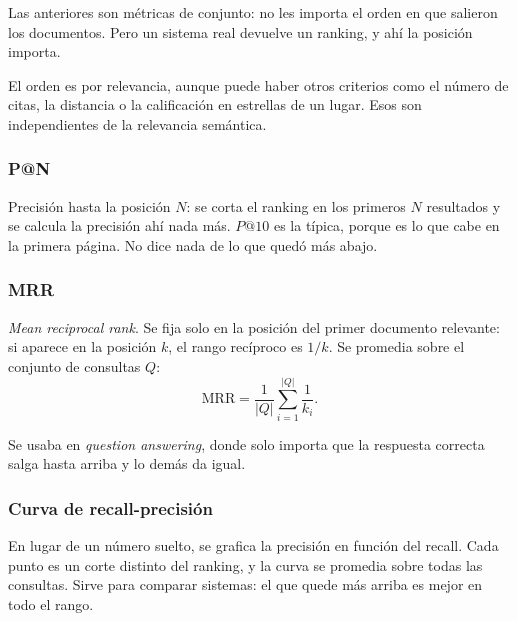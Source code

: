 \documentclass[11pt,letterpaper]{article}
\begin{document}
Las anteriores son métricas de conjunto: no les importa el orden en
que salieron los documentos. Pero un sistema real devuelve un ranking,
y ahí la posición importa.

El orden es por relevancia, aunque puede haber otros criterios como el
número de citas, la distancia o la calificación en estrellas de un
lugar. Esos son independientes de la relevancia semántica.

\subsubsection*{P@N}

Precisión hasta la posición $N$: se corta el ranking en los primeros
$N$ resultados y se calcula la precisión ahí nada más. $P@10$ es la
típica, porque es lo que cabe en la primera página. No dice nada de lo
que quedó más abajo.

\subsubsection*{MRR}

\emph{Mean reciprocal rank}. Se fija solo en la posición del primer
documento relevante: si aparece en la posición $k$, el rango
recíproco es $1/k$. Se promedia sobre el conjunto de consultas $Q$:
\[
    \mathrm{MRR} = \frac{1}{|Q|} \sum_{i=1}^{|Q|} \frac{1}{k_i} .
\]

Se usaba en \emph{question answering}, donde solo importa que la
respuesta correcta salga hasta arriba y lo demás da igual.

\subsubsection*{Curva de recall-precisión}

En lugar de un número suelto, se grafica la precisión en función del
recall. Cada punto es un corte distinto del ranking, y la curva se
promedia sobre todas las consultas. Sirve para comparar sistemas: el
que quede más arriba es mejor en todo el rango.

\begin{figure}[htbp]
  \centering

  
\end{figure}
\end{document}
